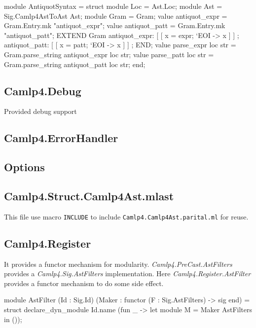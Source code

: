 \begin{ocamlcode*}[gobble=2]
  module AntiquotSyntax = struct
    module Loc  = Ast.Loc;
    module Ast  = Sig.Camlp4AstToAst Ast;
    module Gram = Gram;
    value antiquot_expr = Gram.Entry.mk "antiquot_expr";
    value antiquot_patt = Gram.Entry.mk "antiquot_patt";
    EXTEND Gram
      antiquot_expr:
        [ [ x = expr; `EOI -> x ] ]
      ;
      antiquot_patt:
        [ [ x = patt; `EOI -> x ] ]
      ;
    END;
    value parse_expr loc str = Gram.parse_string antiquot_expr loc str;
    value parse_patt loc str = Gram.parse_string antiquot_patt loc str;
  end;
\end{ocamlcode*}
\subsection{Camlp4.Debug}
\label{sec:Camlp4.Debug}

Provided debug support  

\subsection{Camlp4.ErrorHandler}
\label{sec:ErrorHandler}

\subsection{Options}
\label{sec:Options}


\subsection{Camlp4.Struct.Camlp4Ast.mlast} 

This file use macro \verb|INCLUDE| to include
\verb|Camlp4.Camlp4Ast.parital.ml| for reuse.


\subsection{Camlp4.Register}
It provides a functor mechanism for modularity.
\textit{Camlp4.PreCast.AstFilters} provides a
\textit{Camlp4.Sig.AstFilters} implementation. Here
\textit{Camlp4.Register.AstFilter} provides a functor mechanism
to do some side effect.

\begin{ocamlcode}
module AstFilter
  (Id : Sig.Id) (Maker : functor (F : Sig.AstFilters) -> sig end) =
struct
  declare_dyn_module Id.name (fun _ -> let module M = Maker AstFilters in ());
\end{ocamlcode}

